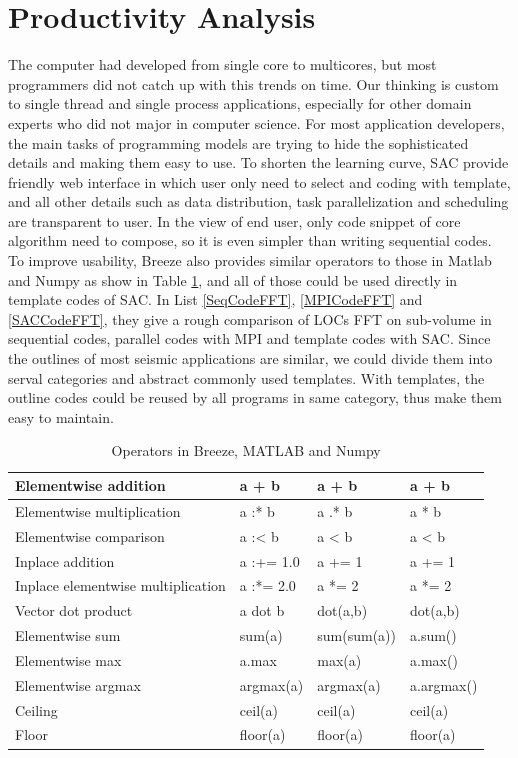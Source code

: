 \section{Productivity Analysis}
The computer had developed from single core to multicores, but most programmers did not catch up with this trends on time. Our thinking is custom to single thread and single process applications, especially for other domain experts who did not major in computer science. For most application developers, the main tasks of programming models are trying to hide the sophisticated details and making them easy to use. To shorten the learning curve, SAC provide friendly web interface in which user only need to select and coding with template, and all other details such as data distribution, task parallelization and scheduling are transparent to user. In the view of end user, only code snippet of core algorithm need to compose, so it is even simpler than writing sequential codes. To improve usability, Breeze also provides similar operators to those in Matlab and Numpy as show in Table \ref{tab:BreezeOperators}, and all of those could be used directly in template codes of SAC. In List \ref{SeqCodeFFT}, \ref{MPICodeFFT} and \ref{SACCodeFFT}, they give a rough comparison of LOCs FFT on sub-volume in sequential codes, parallel codes with MPI and template codes with SAC. Since the outlines of most seismic applications are similar, we could divide them into serval categories and abstract commonly used templates. With templates, the outline codes could be reused by all programs in same category, thus make them easy to maintain.   


\begin{table}[h]
\centering
\caption{Operators in Breeze, MATLAB and Numpy}
\begin{tabular}{||l|l|l|l||}
\hline
Elementwise addition & a + b & a + b & a + b \\
\hline
Elementwise multiplication & a :* b & a .* b & a * b \\
\hline
Elementwise comparison & a :\textless{}  b & a \textless{}  b & a \textless{}  b \\
\hline
Inplace addition & a :+= 1.0 & a += 1 & a += 1 \\
\hline
Inplace elementwise multiplication & a :*= 2.0 & a *= 2 & a *= 2 \\
\hline
Vector dot product & a dot b & dot(a,b)	& dot(a,b) \\
\hline
Elementwise sum	& sum(a) & sum(sum(a)) & a.sum() \\
\hline
Elementwise max & a.max & max(a) & a.max() \\
\hline
Elementwise argmax & argmax(a) & argmax(a) & a.argmax() \\
\hline
Ceiling	& ceil(a) & ceil(a) & ceil(a) \\
\hline
Floor	& floor(a) & floor(a) & floor(a) \\
\hline
\end{tabular}
\label{tab:BreezeOperators}
\end{table}

